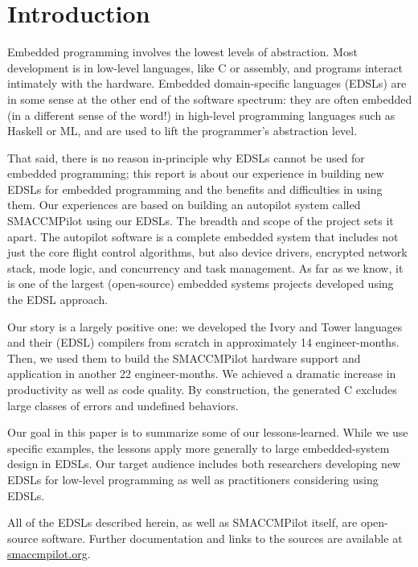 \section{Introduction}

Embedded programming involves the lowest levels of abstraction.  Most development
is in low-level languages, like C or assembly, and programs interact intimately
with the hardware.  Embedded domain-specific languages (EDSLs) are in
some sense at the other end of the software spectrum: they are often embedded
(in a different sense of the word!) in high-level programming languages such as
Haskell or ML, and are used to lift the programmer's abstraction level.

That said, there is no reason in-principle why EDSLs cannot be used for embedded
programming; this report is about our experience in building new EDSLs for
embedded programming and the benefits and difficulties in using them.  Our
experiences are based on building an autopilot system called SMACCMPilot using
our EDSLs.  The breadth and scope of the project sets it apart.  The autopilot
software is a complete embedded system that
includes not just the core flight control algorithms, but also device drivers,
encrypted network stack, mode logic, and concurrency and task management.
As far as we know, it is
one of the largest (open-source) embedded systems projects developed using the
EDSL approach.

Our story is a largely positive one: we developed the Ivory and Tower languages
and their (EDSL) compilers from scratch in approximately 14 engineer-months.
Then,
we used them to build the SMACCMPilot hardware support and application in
another 22 engineer-months.  We achieved a dramatic increase in productivity as
well as code quality.  By construction, the generated C excludes large classes
of errors and undefined behaviors.

Our goal in this paper is to summarize some of our lessons-learned.  While we
use specific examples, the lessons apply more generally to large
embedded-system design in EDSLs.  Our target audience includes both researchers
developing new EDSLs for low-level programming as well as practitioners
considering using EDSLs.

All of the EDSLs described herein, as well as SMACCMPilot itself, are
open-source software. Further documentation and links to the sources are
available at \url{smaccmpilot.org}.




